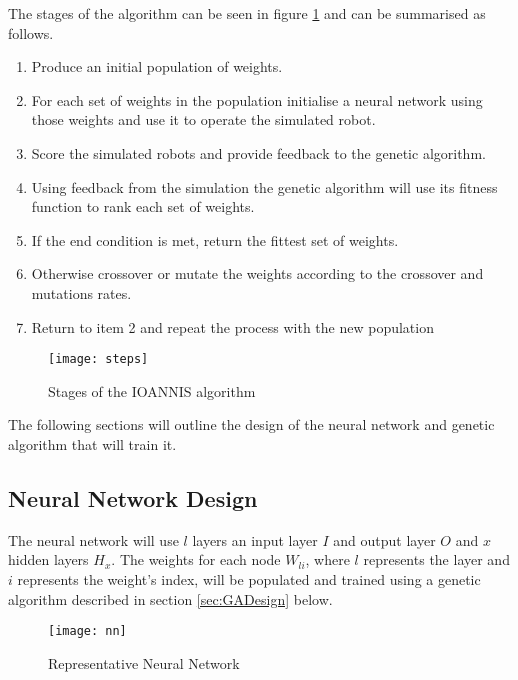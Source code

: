 The stages of the algorithm can be seen in figure \ref{fig:algorithmSteps} and can be summarised as follows.
\begin{enumerate}
	\item Produce an initial population of weights.
	\item For each set of weights in the population initialise a neural network using those weights and use it to operate the simulated robot. 
	\item Score the simulated robots and provide feedback to the genetic algorithm.
	\item Using feedback from the simulation the genetic algorithm will use its fitness function to rank each set of weights. 
	\item If the end condition is met, return the fittest set of weights. 
	\item Otherwise crossover or mutate the weights according to the crossover and mutations rates.
	\item Return to item 2 and repeat the process with the new population
\end{enumerate}

\begin{figure}[h]
	\begin{center}
		\texttt{[image: steps]}
		\caption{Stages of the IOANNIS algorithm}
		\label{fig:algorithmSteps}
	\end{center}
\end{figure}

The following sections will outline the design of the neural network and genetic algorithm that will train it. 

\subsection{Neural Network Design}
The neural network will use $l$ layers an input layer $I$ and output layer $O$ and $x$ hidden layers $H_x$. The weights for each node $W_{li}$, where $l$ represents the layer and $i$ represents the weight's index, will be populated and trained using a genetic algorithm described in section \ref{sec:GADesign} below.

\begin{figure}[h]
	\begin{center}
		\texttt{[image: nn]}
		\caption{Representative Neural Network}
		\label{fig:neuralNetwork}
	\end{center}
\end{figure}

